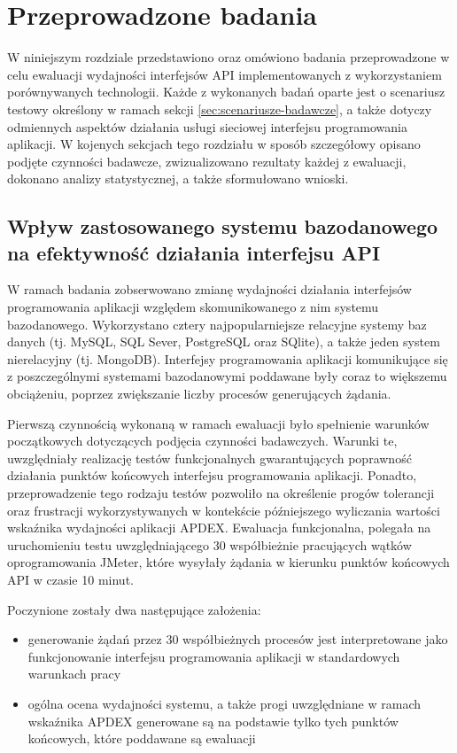 \chapter{Przeprowadzone badania}
W niniejszym rozdziale przedstawiono oraz omówiono badania przeprowadzone w celu ewaluacji wydajności interfejsów API implementowanych z wykorzystaniem porównywanych technologii. Każde z wykonanych badań oparte jest o scenariusz testowy określony w ramach sekcji \ref{sec:scenariusze-badawcze}, a także dotyczy odmiennych aspektów działania usługi sieciowej interfejsu programowania aplikacji. W kojenych sekcjach tego rozdziału w sposób szczegółowy opisano podjęte czynności badawcze, zwizualizowano rezultaty każdej z ewaluacji, dokonano analizy statystycznej, a także sformułowano wnioski.

\section{Wpływ zastosowanego systemu bazodanowego na efektywność działania interfejsu API}
W ramach badania zobserwowano zmianę wydajności działania interfejsów programowania aplikacji względem skomunikowanego z nim systemu bazodanowego. Wykorzystano cztery najpopularniejsze relacyjne systemy baz danych (tj. MySQL, SQL Sever, PostgreSQL oraz SQlite), a także jeden system nierelacyjny (tj. MongoDB). Interfejsy programowania aplikacji komunikujące się z poszczególnymi systemami bazodanowymi poddawane były coraz to większemu obciążeniu, poprzez zwiększanie liczby procesów generujących żądania.

Pierwszą czynnością wykonaną w ramach ewaluacji było spełnienie warunków początkowych dotyczących podjęcia czynności badawczych. Warunki te, uwzględniały realizację testów funkcjonalnych gwarantujących poprawność działania punktów końcowych interfejsu programowania aplikacji. Ponadto, przeprowadzenie tego rodzaju testów pozwoliło na określenie progów tolerancji oraz frustracji wykorzystywanych w kontekście późniejszego wyliczania wartości wskaźnika wydajności aplikacji APDEX. Ewaluacja funkcjonalna, polegała na uruchomieniu testu uwzględniającego 30 współbieżnie pracujących wątków oprogramowania JMeter, które wysyłały żądania w kierunku punktów końcowych API w czasie 10 minut.

Poczynione zostały dwa następujące założenia:
\begin{itemize}
    \item generowanie żądań przez 30 współbieżnych procesów jest interpretowane jako funkcjonowanie interfejsu programowania aplikacji w standardowych warunkach pracy
    \item ogólna ocena wydajności systemu, a także progi uwzględniane w ramach wskaźnika APDEX generowane są na podstawie tylko tych punktów końcowych, które poddawane są ewaluacji
\end{itemize}

